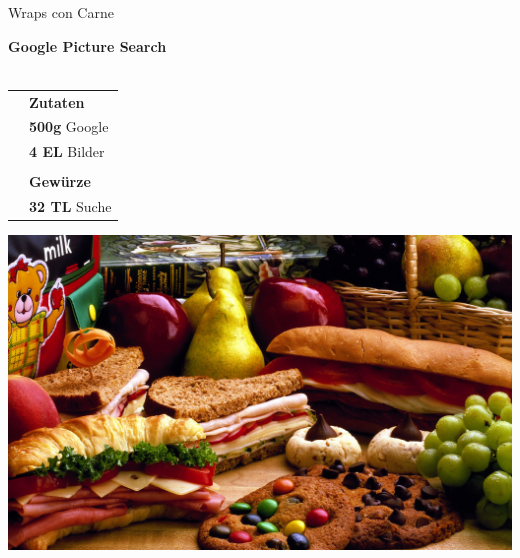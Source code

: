 \begin{cleanrecipe}{Wraps con Carne}

	
	\blindtext
\end{cleanrecipe}


	
\begin{center}
	\Huge 
	\textbf{Google Picture Search}\\
	\vspace*{-\baselineskip}
	\vspace{0.4cm}
	\\
	\normalsize
	\Oven
\end{center}
	\begin{table}
		\begin{tabulary}{4cm}{rL}
			& \textbf{Zutaten} \\
			& \textbf{500g} Google \\
			& \textbf{4 EL} Bilder \\
			& \\
			& \textbf{Gewürze} \\
			& \textbf{32 TL} Suche \\
		\end{tabulary}
	\end{table}	

\blindtext
\blindtext
\vfill
\begin{minipage}[b][0.5\textheight][t]{\textwidth}
		\centering
		\includegraphics[width=\textwidth, height=0.35\textheight]{pictures/somefood.jpg}
\end{minipage}

